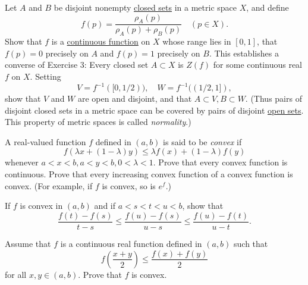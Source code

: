  \begin{exercise}[Rudin 4.22]
    Let $A$ and $B$ be disjoint nonempty \hyperref[pst-def:closed]{closed sets} in a metric space $X$, and define
    \begin{equation}
      f(p) = \frac{\rho_A(p)}{\rho_A(p) + \rho_B(p)} \quad (p \in X).
    \end{equation}
    Show that $f$ is a \hyperref[pst-def:continuous_func]{continuous function} on $X$ whose range lies in $[0, 1]$, that $f(p) = 0$ precisely on $A$ and $f(p) = 1$ precisely on $B$. This establishes a converse of Exercise 3: Every closed set $A \subset X$ is $Z(f)$ for some continuous real $f$ on $X$. Setting
    \begin{equation}
      V = f^{-1}([0, 1/2)), \quad W = f^{-1}((1/2, 1]),
    \end{equation}
    show that $V$ and $W$ are open and disjoint, and that $A \subset V, B \subset W$. (Thus pairs of disjoint closed sets in a metric space can be covered by pairs of disjoint \hyperref[pst-def:open-set]{open sets}. This property of metric spaces is called \textit{normality}.)
  \end{exercise}
  \begin{solution}

  \end{solution}

  \begin{exercise}[Rudin 4.23]
    A real-valued function $f$ defined in $(a, b)$ is said to be \textit{convex} if
    \begin{equation}
      f(\lambda x + (1 - \lambda)y) \le \lambda f(x) + (1 - \lambda)f(y)
    \end{equation}
    whenever $a < x < b, a < y < b, 0 < \lambda < 1$. Prove that every convex function is continuous. Prove that every increasing convex function of a convex function is convex. (For example, if $f$ is convex, so is $e^f$.)
    \par If $f$ is convex in $(a, b)$ and if $a < s < t < u < b$, show that
    \begin{equation}
      \frac{f(t) - f(s)}{t - s} \le \frac{f(u) - f(s)}{u - s} \le \frac{f(u) - f(t)}{u - t}.
    \end{equation}
  \end{exercise}
  \begin{solution}

  \end{solution}

  \begin{exercise}[Rudin 4.24]
    Assume that $f$ is a continuous real function defined in $(a, b)$ such that
    \begin{equation}
      f\left( \frac{x+y}{2} \right) \le \frac{f(x) + f(y)}{2}
    \end{equation}
    for all $x, y \in (a, b)$. Prove that $f$ is convex.
  \end{exercise}
  \begin{solution}

  \end{solution}

